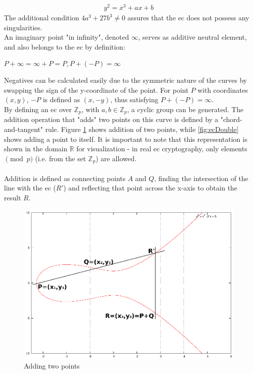 \begin{align}\label{basicEC}
 y^2 = x^3 + ax +b
\end{align}
The additional condition $4a^3 + 27b^3 \neq 0$ assures that the \gls{ec} does not possess any singularities.
\\
An imaginary point "in infinity", denoted $\infty$, serves as additive neutral element, and also belongs to the \gls{ec} by definition:
\begin{center}
 $P + \infty = \infty + P = P, P + (-P) = \infty$
\end{center}
Negatives can be calculated easily due to the symmetric nature of the curves by swapping the sign of the y-coordinate of the point. For point $P$ with coordinates $(x, y)$, $-P$ is defined as
$(x,-y)$, thus satisfying $P + (-P) = \infty$.
\\
By defining an \gls{ec} over $\mathbb{Z}_p$, with $a, b \in \mathbb{Z}_p$, a cyclic group can be generated. The addition operation that "adds" two points on
this curve is defined by a "chord-and-tangent" rule. Figure \ref{fig:ecAdd}
shows addition of two points, while \ref{fig:ecDouble} shows adding a point to itself. It is important to note that this representation is shown in the domain
$\mathbb{R}$ for visualization - in real \gls{ec} cryptography, only elements $\pmod p$ (i.e. from the set $\mathbb{Z}_p$)
are allowed. 
\\
\\
Addition is defined as connecting points $A$ and 
$Q$, finding the intersection of the line with the \gls{ec} ($R'$) and reflecting that point across the x-axis to obtain the result $R$. 
          \begin{figure}[H]
          \centering
              \includegraphics[width=0.6\linewidth]{figures/ecAdd.eps}
              \caption{Adding two points}
              \label{fig:ecAdd}
          \end{figure}
